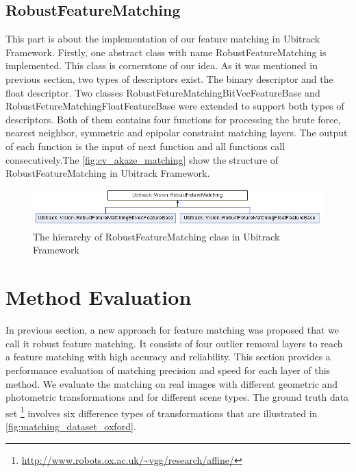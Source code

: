 \subsection {RobustFeatureMatching}
This part is about the implementation of our feature matching in Ubitrack Framework. Firstly, one abstract class with name RobustFeatureMatching is implemented. This class is cornerstone of our idea. As it was mentioned in previous section, two types of descriptors exist. The binary descriptor and the float descriptor. Two classes RobustFetureMatchingBitVecFeatureBase and RobustFetureMatchingFloatFeatureBase were extended to support both types of descriptors. Both of them contains four functions for processing the brute force, nearest neighbor, symmetric and epipolar constraint matching layers. The output of each function is the input of next function and all functions call consecutively.The \autoref{fig:cv_akaze_matching} show the structure of RobustFeatureMatching in Ubitrack Framework.

\begin{figure}[H]
  \centering
  \includegraphics[width=140mm]{figures/robust_feature_matching}
  \caption{The hierarchy of RobustFeatureMatching class in Ubitrack Framework}\label{fig:cv_akaze_matching}
\end{figure}


\section {Method Evaluation}
In previous section, a new approach for feature matching was proposed that we call it robust feature matching. It consists of four outlier removal layers to reach a feature matching with high accuracy and reliability. This section provides a performance evaluation of matching precision and speed for each layer of this method. We evaluate the matching on real images with different geometric and photometric transformations and for different scene types. The ground truth data set \footnote {\url{http://www.robots.ox.ac.uk/~vgg/research/affine/}} involves six difference types of transformations that are illustrated in \autoref{fig:matching_dataset_oxford}.

